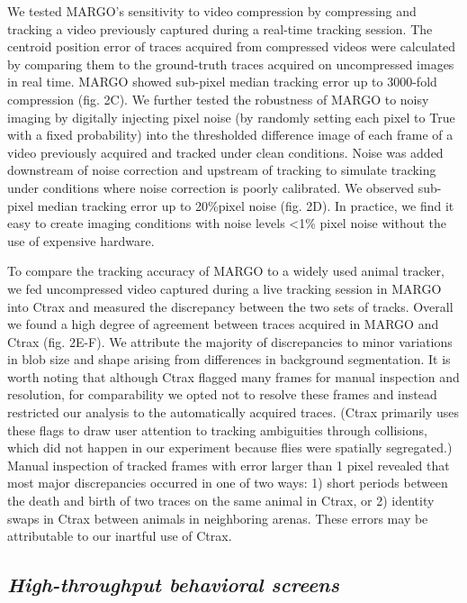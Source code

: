 \documentclass[10pt,letterpaper]{article}
\begin{document}
We tested MARGO's sensitivity to video compression by compressing and tracking a video previously captured during a real-time tracking session. The centroid position error of traces acquired from compressed videos were calculated by comparing them to the ground-truth traces acquired on uncompressed images in real time. MARGO showed sub-pixel median tracking error up to 3000-fold compression (fig. 2C). We further tested the robustness of MARGO to noisy imaging by digitally injecting pixel noise (by randomly setting each pixel to True with a fixed probability) into the thresholded difference image of each frame of a video previously acquired and tracked under clean conditions. Noise was added downstream of noise correction and upstream of tracking to simulate tracking under conditions where noise correction is poorly calibrated. We observed sub-pixel median tracking error up to 20\%pixel noise (fig. 2D). In practice, we find it easy to create imaging conditions with noise levels <1\% pixel noise without the use of expensive hardware.

To compare the tracking accuracy of MARGO to a widely used animal tracker, we fed uncompressed video captured during a live tracking session in MARGO into Ctrax \cite{Branson_High_2009} and measured the discrepancy between the two sets of tracks. Overall we found a high degree of agreement between traces acquired in MARGO and Ctrax (fig. 2E-F). We attribute the majority of discrepancies to minor variations in blob size and shape arising from differences in background segmentation. It is worth noting that although Ctrax flagged many frames for manual inspection and resolution, for comparability we opted not to resolve these frames and instead restricted our analysis to the automatically acquired traces. (Ctrax primarily uses these flags to draw user attention to tracking ambiguities through collisions, which did not happen in our experiment because flies were spatially segregated.) Manual inspection of tracked frames with error larger than 1 pixel revealed that most major discrepancies occurred in one of two ways: 1) short periods between the death and birth of two traces on the same animal in Ctrax, or 2) identity swaps in Ctrax between animals in neighboring arenas. These errors may be attributable to our inartful use of Ctrax.

\subsection*{\textit{High-throughput behavioral screens}}
\end{document}
